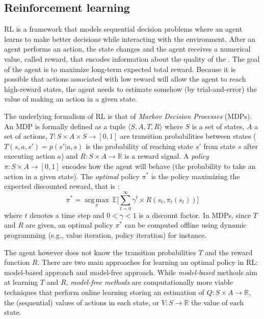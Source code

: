 \subsection{Reinforcement learning}

RL is a framework that models sequential decision
problems where an agent learns to make better decisions while interacting with
the environment. After an agent performs an action, the state changes and the
agent receives a numerical value, called reward, that encodes information
about the quality of the . The goal of the agent is to maximize
 long-term expected total reward. Because it is possible that actions associated 
with low reward will allow the agent to reach high-reward states, the agent
needs to estimate somehow (by trial-and-error) the value of making an action in
a given state.

The underlying formalism of RL is that of {\em Markov Decision Processes} (MDPs).
An MDP is formally defined as a tuple $\langle S, A, T, R \rangle$ where $S$ is a set of states, $A$ a set of actions, $T : S \times A \times S \rightarrow [0, 1]$ 
are transition probabilities between states
($T(s,a,s')=p(s'|a,s)$ is the probability of reaching state $s'$ from state $s$ after executing action $a$) and 
$R : S \times A \rightarrow \mathbb{R}$ is a reward signal. A \textit{policy} $\pi : S \times A \rightarrow [0, 1]$ encodes how the agent will behave (the probability
to take an action in a given state).
The {\em optimal} policy $\pi^*$ is the policy maximizing the expected discounted reward, that is :
\begin{equation}
\pi^* = \underset{\pi}{\operatorname{arg\,max}}\ \mathbb{E} \Big[ \sum\limits_{t=0}^{\infty} \gamma^t \times R(s_t, \pi_t(s_t)) \Big]
\end{equation}
where $t$ denotes a time step and $0 < \gamma < 1$ is a discount factor.
In MDPs, since $T$ and $R$ are given, an optimal policy $\pi^*$ can be computed offline using dynamic programming (e.g., value iteration, policy                                                                  
iteration) \cite{Howard1960} for instance.

The agent however does not know the transition probabilities $T$ and the reward function $R$.
There are two main approaches for learning an optimal policy in RL: model-based approach and model-free approach.
While {\em model-based} methods aim at learning $T$ and $R$,
{\em model-free methods} are computationally more viable techniques
that perform online learning storing an estimation of $Q : S \times A \rightarrow \mathbb{R}$, the (sequential) values of actions in each state,
or $V : S \rightarrow \mathbb{R}$ the value of each state.

